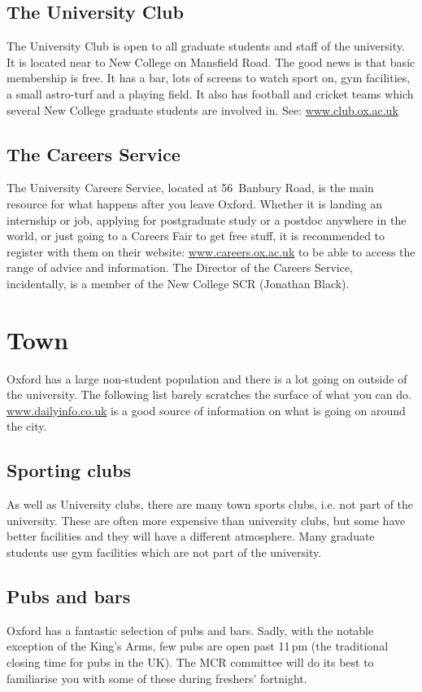 \documentclass[a4paper,fleqn,12pt]{book} %
\begin{document}
\subsection{The University Club}
The University Club is open to all graduate students and staff of the
university. It is located near to New College on Mansfield Road. The good news
is that basic membership is free. It has a bar, lots of screens to watch sport
on, gym facilities, a small astro-turf and a playing field. It also has football and cricket teams which several New College graduate students are involved in. See: \url{www.club.ox.ac.uk}
\subsection{The Careers Service}
The University Careers Service, located at 56~Banbury Road, is the main resource
for what happens after you leave Oxford. Whether it is landing an internship or
job, applying for postgraduate study or a postdoc anywhere in the world, or just going to a Careers Fair to get free stuff, it is recommended to register with them on their website: \url{www.careers.ox.ac.uk} to be able to access the range of advice and information. The Director of the Careers Service, incidentally, is a member of the New College SCR (Jonathan Black).

\section{Town}
Oxford has a large non-student population and there is a lot going on outside of
the university. The following list barely scratches the surface of what you can
do. \url{www.dailyinfo.co.uk} is a good source of information on what is going
on around the city.
\subsection{Sporting clubs}
As well as University clubs, there are many town sports clubs, i.e. not part of the university. These are often more expensive than university clubs, but some have better facilities and they will have a different atmosphere. Many graduate students use gym facilities which are not part of the university.
\subsection{Pubs and bars}
Oxford has a fantastic selection of pubs and bars. Sadly, with the notable
exception of the King's Arms, few pubs are open past 11\,pm (the traditional
closing time for pubs in the UK). The MCR committee will do its best to familiarise you with some of these during freshers' fortnight.
\end{document}
